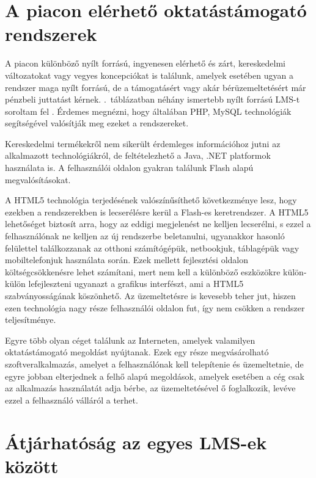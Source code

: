 \section{A piacon elérhető oktatástámogató rendszerek}

A piacon különböző nyílt forrású, ingyenesen elérhető és zárt, kereskedelmi változatokat vagy vegyes koncepciókat is találunk, amelyek esetében ugyan a rendszer maga nyílt forrású, de a támogatásért vagy akár bérüzemeltetésért már pénzbeli juttatást kérnek. .~táblázatban néhány ismertebb nyílt forrású LMS-t soroltam fel \cite{lms}. Érdemes megnézni, hogy általában PHP, MySQL technológiák segítségével valósítják meg ezeket a rendszereket.



Kereskedelmi termékekről nem sikerült érdemleges információhoz jutni az alkalmazott technológiákról, de feltételezhető a Java, .NET platformok használata is. A felhasználói oldalon gyakran találunk Flash alapú megvalósításokat.

A HTML5 technológia terjedésének valószínűsíthető következménye lesz, hogy ezekben a rendszerekben is lecserélésre kerül a Flash-es keretrendszer. A HTML5 lehetőséget biztosít arra, hogy az eddigi megjelenést ne kelljen lecserélni, s ezzel a felhasználónak ne kelljen az új rendszerbe beletanulni, ugyanakkor hasonló felülettel találkozzanak az otthoni számítógépük, netbookjuk, táblagépük vagy mobiltelefonjuk használata során. Ezek mellett fejlesztési oldalon költségcsökkenésre lehet számítani, mert nem kell a különböző eszközökre külön-külön lefejleszteni ugyanazt a grafikus interfészt, ami a HTML5 szabványosságának köszönhető. Az üzemeltetésre is kevesebb teher jut, hiszen ezen technológia nagy része felhasználói oldalon fut, így nem csökken a rendszer teljesítménye.

Egyre több olyan céget találunk az Interneten, amelyek valamilyen oktatástámogató megoldást nyújtanak. Ezek egy része megvásárolható szoftveralkalmazás, amelyet a felhasználónak kell telepítenie és üzemeltetnie, de egyre jobban elterjednek a felhő alapú megoldások, amelyek esetében a cég csak az alkalmazás használatát adja bérbe, az üzemeltetésével ő foglalkozik, levéve ezzel a felhasználó válláról a terhet.

\section{Átjárhatóság az egyes LMS-ek között}

